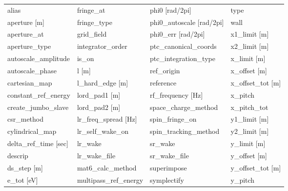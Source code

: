  \begin{tabular}{llll} \toprule
alias                          & fringe_at                      & phi0 [rad/2pi]                 & type                           \\
aperture [m]                   & fringe_type                    & phi0_autoscale [rad/2pi]       & wall                           \\
aperture_at                    & grid_field                     & phi0_err [rad/2pi]             & x1_limit [m]                   \\
aperture_type                  & integrator_order               & ptc_canonical_coords           & x2_limit [m]                   \\
autoscale_amplitude            & is_on                          & ptc_integration_type           & x_limit [m]                    \\
autoscale_phase                & l [m]                          & ref_origin                     & x_offset [m]                   \\
cartesian_map                  & l_hard_edge [m]                & reference                      & x_offset_tot [m]               \\
constant_ref_energy            & lord_pad1 [m]                  & rf_frequency [Hz]              & x_pitch                        \\
create_jumbo_slave             & lord_pad2 [m]                  & space_charge_method            & x_pitch_tot                    \\
csr_method                     & lr_freq_spread [Hz]            & spin_fringe_on                 & y1_limit [m]                   \\
cylindrical_map                & lr_self_wake_on                & spin_tracking_method           & y2_limit [m]                   \\
delta_ref_time [sec]           & lr_wake                        & sr_wake                        & y_limit [m]                    \\
descrip                        & lr_wake_file                   & sr_wake_file                   & y_offset [m]                   \\
ds_step [m]                    & mat6_calc_method               & superimpose                    & y_offset_tot [m]               \\
e_tot [eV]                     & multipass_ref_energy           & symplectify                    & y_pitch                        \\

\end{tabular}
